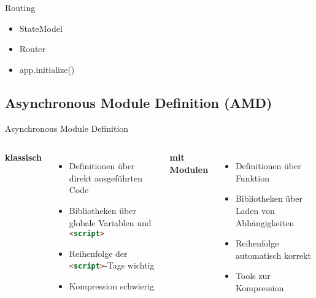 \begin{frame}{Routing}
  \begin{itemize}
    \item StateModel
    \item Router
    \item app.initialize()
  \end{itemize}
\end{frame}

\subsection[AMD]{Asynchronous Module Definition (AMD)}


\begin{frame}{Asynchronous Module Definition}
  \begin{columns}
    {\large\bfseries\color{maincolor}klassisch}
    \begin{itemize}
      \item Definitionen über direkt ausgeführten Code
      \item Bibliotheken über globale Variablen und \lstinline[language=HTML]-<script>-
      \item Reihenfolge der \lstinline[language=HTML]-<script>--Tags wichtig
      \item Kompression schwierig
    \end{itemize}
    {\large\bfseries\color{maincolor}mit Modulen}
    \begin{itemize}
      \item Definitionen über Funktion
      \item Bibliotheken über Laden von Abhängigkeiten
      \item Reihenfolge automatisch korrekt
      \item Tools zur Kompression
    \end{itemize}
  \end{columns}
\end{frame}

